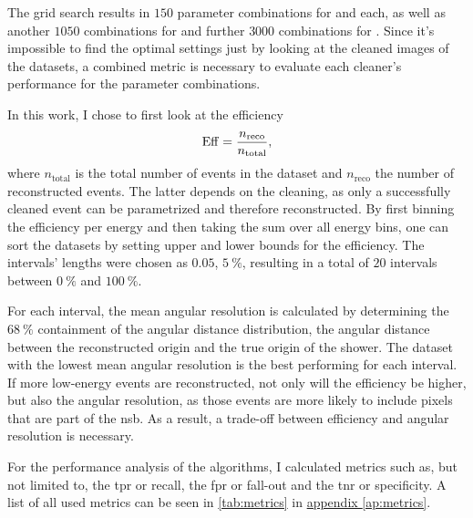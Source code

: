 
The grid search results in \(\num{150}\) parameter combinations for \tailcuts{} and \mars{} each,
as well as another \(\num{1050}\) combinations for \fact{} and further \(\num{3000}\) combinations for \tcc{}.
Since it's impossible to find the optimal settings just by looking at the
cleaned images of the datasets, a combined metric is necessary to evaluate each cleaner's performance
for the parameter combinations.

In this work, I chose to first look at the efficiency
\begin{equation}\label{eq:efficiency}
    \operatorname{Eff} =  \frac{n_{\mathrm{reco}}}{n_{\mathrm{total}}},
\end{equation}
where \(n_{\mathrm{total}}\) is the total number of events in the dataset and \(n_{\mathrm{reco}}\)
the number of reconstructed events. The latter depends on the cleaning, as only a successfully cleaned
event can be parametrized and therefore reconstructed. By first binning the efficiency per energy and then
taking the sum over all energy bins, one can sort the datasets by setting upper and lower bounds for the efficiency.
The intervals' lengths were chosen as \(\num{0.05}\), \ie \(\SI{5}{\percent}\), resulting in a total
of \(\num{20}\) intervals between \(\SI{0}{\percent}\) and \(\SI{100}{\percent}\).

For each interval, the mean angular resolution is calculated by determining the
\(\SI{68}{\percent}\) containment of the angular distance distribution, \ie the angular distance
between the reconstructed origin and the true origin of the shower.
The dataset with the lowest mean angular resolution is the best performing for each interval.
If more low-energy events are reconstructed, not only will the efficiency be higher, but also the angular resolution,
as those events are more likely to include pixels that are part of the \gls{nsb}.
As a result, a trade-off between efficiency and angular resolution is necessary.

For the performance analysis of the algorithms, I calculated metrics such as, but not limited to, the \gls{tpr} or recall,
the \gls{fpr} or fall-out and the \gls{tnr} or specificity. A list of all used metrics can be seen in \autoref{tab:metrics}
in \hyperref[ap:metrics]{appendix \ref{ap:metrics}}.